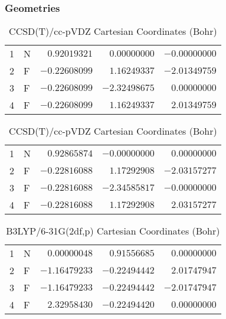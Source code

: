 \documentclass[10pt,oneside]{article}
\begin{document}
\begin{table}[h!]
\subsubsection*{Geometries}
\begin{multicols}{2}
\centering
\caption{CCSD(T)/cc-pVTZ Cartesian Coordinates (Bohr)}
\begin{tabular}{llrrr}
\toprule
1  & N  & $ 0.92019321$ & $ 0.00000000$ & $-0.00000000$ \\
2  & F  & $-0.22608099$ & $ 1.16249337$ & $-2.01349759$ \\
3  & F  & $-0.22608099$ & $-2.32498675$ & $ 0.00000000$ \\
4  & F  & $-0.22608099$ & $ 1.16249337$ & $ 2.01349759$ \\
\bottomrule
\end{tabular}
\caption{CCSD(T)/cc-pVDZ Cartesian Coordinates (Bohr)}
\begin{tabular}{llrrr}
\toprule
1  & N  & $ 0.92865874$ & $-0.00000000$ & $ 0.00000000$ \\
2  & F  & $-0.22816088$ & $ 1.17292908$ & $-2.03157277$ \\
3  & F  & $-0.22816088$ & $-2.34585817$ & $-0.00000000$ \\
4  & F  & $-0.22816088$ & $ 1.17292908$ & $ 2.03157277$ \\
\bottomrule
\end{tabular}
\end{multicols}
\end{table}

\begin{table}[h]
\centering
\caption{B3LYP/6-31G(2df,p) Cartesian Coordinates (Bohr)}
\begin{tabular}{llrrr}
\toprule
1  & N  & $ 0.00000048$ & $ 0.91556685$ & $ 0.00000000$ \\
2  & F  & $-1.16479233$ & $-0.22494442$ & $ 2.01747947$ \\
3  & F  & $-1.16479233$ & $-0.22494442$ & $-2.01747947$ \\
4  & F  & $ 2.32958430$ & $-0.22494420$ & $ 0.00000000$ \\
\bottomrule
\end{tabular}
\end{table}
\end{document}

